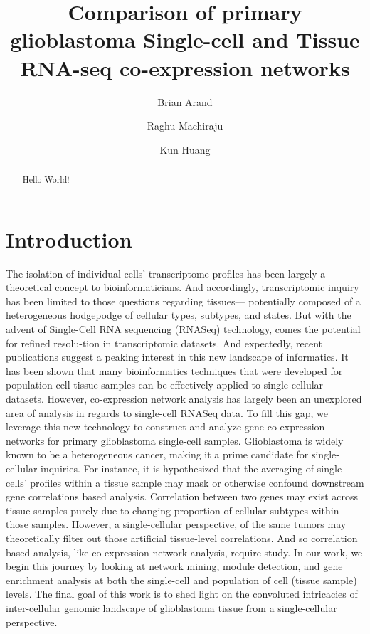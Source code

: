 \documentclass[11pt,twoside,a4paper]{article}
\begin{document}
\title{Comparison of primary glioblastoma Single-cell and Tissue RNA-seq co-expression networks}
\author{Brian Arand \and Raghu Machiraju \and Kun Huang}
\maketitle

\begin{abstract}
Hello World! 
\end{abstract}

\section{Introduction}
The isolation of individual cells’ transcriptome profiles has been largely a theoretical concept to bioinformaticians. And accordingly, transcriptomic inquiry has been limited to those questions regarding tissues— potentially composed of a heterogeneous hodgepodge of cellular types, subtypes, and states. But with the advent of Single-Cell RNA sequencing (RNASeq) technology, comes the potential for refined resolu-tion in transcriptomic datasets. And expectedly, recent publications suggest a peaking interest in this new landscape of informatics. It has been shown that many bioinformatics techniques that were developed for population-cell tissue samples can be effectively applied to single-cellular datasets. However, co-expression network analysis has largely been an unexplored area of analysis in regards to single-cell RNASeq data. To fill this gap, we leverage this new technology to construct and analyze gene co-expression networks for primary glioblastoma single-cell samples. Glioblastoma is widely known to be a heterogeneous cancer, making it a prime candidate for single-cellular inquiries. For instance, it is hypothesized that the averaging of single-cells’ profiles within a tissue sample may mask or otherwise confound downstream gene correlations based analysis.  Correlation between two genes may exist across tissue samples purely due to changing proportion of cellular subtypes within those samples. However, a single-cellular perspective, of the same tumors may theoretically filter out those artificial tissue-level correlations. And so correlation based analysis, like co-expression network analysis, require study. In our work, we begin this journey by looking at network mining, module detection, and gene enrichment analysis at both the single-cell and population of cell (tissue sample) levels. The final goal of this work is to shed light on the convoluted intricacies of inter-cellular genomic landscape of glioblastoma tissue from a single-cellular perspective.
\end{document}
